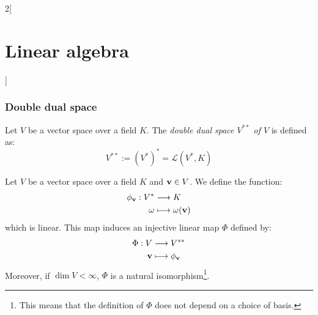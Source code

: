 \documentclass[../../../main.tex]{subfiles}
\begin{document}
\begin{multicols}{2}[\section{Linear algebra}]
    \subsubsection*{Double dual space}
    \begin{definition}
        Let $V$ be a vector space over a field $K$. The \textit{double dual space $V^{**}$ of $V$} is defined as: $$V^{**}:={(V^*)}^*=\mathcal{L}(V^*,K)$$
    \end{definition}
    \begin{prop}
        Let $V$ be a vector space over a field $K$ and $\boldsymbol{\mathrm{v}}\in V$. We define the function:
        \begin{align*}
            \phi_{\boldsymbol{\mathrm{v}}}:V^* & \longrightarrow K                     \\
            \omega                        & \longmapsto\omega(\boldsymbol{\mathrm{v}})
        \end{align*}
        which is linear. This map induces an injective linear map $\Phi$ defined by:
        \begin{align*}
            \Phi:V             & \longrightarrow V^{**}               \\
            \boldsymbol{\mathrm{v}} & \longmapsto\phi_{\boldsymbol{\mathrm{v}}}
        \end{align*}
        Moreover, if $\dim V<\infty$, $\Phi$ is a natural isomorphism\footnote{This means that the definition of $\Phi$ does not depend on a choice of basis.}.
    \end{prop}

\end{multicols}
\end{document}
